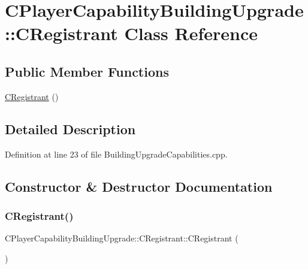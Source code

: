 \hypertarget{classCPlayerCapabilityBuildingUpgrade_1_1CRegistrant}{}\section{C\+Player\+Capability\+Building\+Upgrade\+:\+:C\+Registrant Class Reference}
\label{classCPlayerCapabilityBuildingUpgrade_1_1CRegistrant}
\subsection*{Public Member Functions}
\begin{DoxyCompactItemize}
\item 
\hyperlink{classCPlayerCapabilityBuildingUpgrade_1_1CRegistrant_a85e216de0285430da642fa71f2a79a34}{C\+Registrant} ()
\end{DoxyCompactItemize}


\subsection{Detailed Description}


Definition at line 23 of file Building\+Upgrade\+Capabilities.\+cpp.



\subsection{Constructor \& Destructor Documentation}
\hypertarget{classCPlayerCapabilityBuildingUpgrade_1_1CRegistrant_a85e216de0285430da642fa71f2a79a34}{}\label{classCPlayerCapabilityBuildingUpgrade_1_1CRegistrant_a85e216de0285430da642fa71f2a79a34} 
\subsubsection{\texorpdfstring{C\+Registrant()}{CRegistrant()}}
{\footnotesize\ttfamily C\+Player\+Capability\+Building\+Upgrade\+::\+C\+Registrant\+::\+C\+Registrant (\begin{DoxyParamCaption}{ }\end{DoxyParamCaption})}



